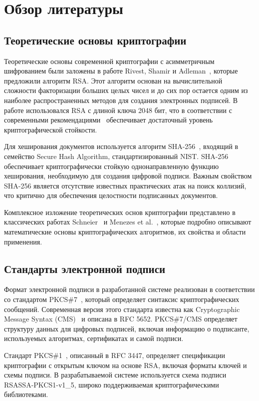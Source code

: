 \documentclass[a4paper,12pt]{extarticle}
\begin{document}
\section{Обзор литературы}

\subsection{Теоретические основы криптографии}

Теоретические основы современной криптографии с асимметричным шифрованием были заложены в работе Rivest, Shamir и Adleman~\cite{rivest1978}, которые предложили алгоритм RSA. Этот алгоритм основан на вычислительной сложности факторизации больших целых чисел и до сих пор остается одним из наиболее распространенных методов для создания электронных подписей. В работе использовался RSA с длиной ключа 2048 бит, что в соответствии с современными рекомендациями~\cite{schneier,menezes} обеспечивает достаточный уровень криптографической стойкости.

Для хеширования документов используется алгоритм SHA-256~\cite{sha256}, входящий в семейство Secure Hash Algorithm, стандартизированный NIST. SHA-256 обеспечивает криптографически стойкую однонаправленную функцию хеширования, необходимую для создания цифровой подписи. Важным свойством SHA-256 является отсутствие известных практических атак на поиск коллизий, что критично для обеспечения целостности подписанных документов.

Комплексное изложение теоретических основ криптографии представлено в классических работах Schneier~\cite{schneier} и Menezes et al.~\cite{menezes}, которые подробно описывают математические основы криптографических алгоритмов, их свойства и области применения.

\subsection{Стандарты электронной подписи}

Формат электронной подписи в разработанной системе реализован в соответствии со стандартом PKCS\#7~\cite{pkcs7}, который определяет синтаксис криптографических сообщений. Современная версия этого стандарта известна как Cryptographic Message Syntax (CMS)~\cite{rfc5652} и описана в RFC 5652. PKCS\#7/CMS определяет структуру данных для цифровых подписей, включая информацию о подписанте, используемых алгоритмах, сертификатах и самой подписи.


Стандарт PKCS\#1~\cite{rfc3447}, описанный в RFC 3447, определяет спецификации криптографии с открытым ключом на основе RSA, включая форматы ключей и схемы подписи. В разрабатываемой системе используется схема подписи RSASSA-PKCS1-v1\_5, широко поддерживаемая криптографическими библиотеками.
\end{document}
